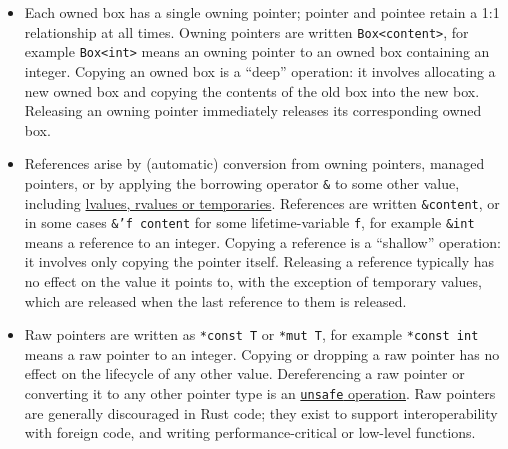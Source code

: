 \documentclass[]{article}
\begin{document}
\begin{itemize}
\item

  Each owned box has a single owning pointer; pointer and pointee retain
  a 1:1 relationship at all times. Owning pointers are written
  \texttt{Box\textless{}content\textgreater{}}, for example
  \texttt{Box\textless{}int\textgreater{}} means an owning pointer to an
  owned box containing an integer. Copying an owned box is a ``deep''
  operation: it involves allocating a new owned box and copying the
  contents of the old box into the new box. Releasing an owning pointer
  immediately releases its corresponding owned box.
\item

  References arise by (automatic) conversion from owning pointers,
  managed pointers, or by applying the borrowing operator \texttt{\&} to
  some other value, including
  \hyperref[lvaluesux2c-rvalues-and-temporaries]{lvalues, rvalues or
  temporaries}. References are written \texttt{\&content}, or in some
  cases \texttt{\&'f content} for some lifetime-variable \texttt{f}, for
  example \texttt{\&int} means a reference to an integer. Copying a
  reference is a ``shallow'' operation: it involves only copying the
  pointer itself. Releasing a reference typically has no effect on the
  value it points to, with the exception of temporary values, which are
  released when the last reference to them is released.
\item

  Raw pointers are written as \texttt{*const T} or \texttt{*mut T}, for
  example \texttt{*const int} means a raw pointer to an integer. Copying
  or dropping a raw pointer has no effect on the lifecycle of any other
  value. Dereferencing a raw pointer or converting it to any other
  pointer type is an \hyperref[unsafe-functions]{\texttt{unsafe}
  operation}. Raw pointers are generally discouraged in Rust code; they
  exist to support interoperability with foreign code, and writing
  performance-critical or low-level functions.
\end{itemize}
\end{document}
